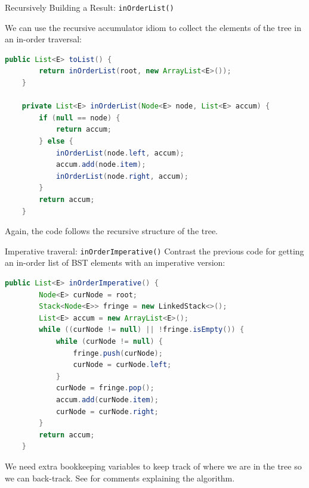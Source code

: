 \documentclass{beamer}
\begin{document}
\begin{frame}[fragile]{Recursively Building a Result: {\tt inOrderList()}}

We can use the recursive accumulator idiom to collect the elements of the tree in an in-order traversal:
\begin{lstlisting}[language=Java]
    public List<E> toList() {
        return inOrderList(root, new ArrayList<E>());
    }

    private List<E> inOrderList(Node<E> node, List<E> accum) {
        if (null == node) {
            return accum;
        } else {
            inOrderList(node.left, accum);
            accum.add(node.item);
            inOrderList(node.right, accum);
        }
        return accum;
    }
\end{lstlisting}

Again, the code follows the recursive structure of the tree.

\end{frame}

\begin{frame}[fragile]{Imperative traveral: {\tt inOrderImperative()}}
\vspace{-.05in}
Contrast the previous code for getting an in-order list of BST elements with an imperative version:
\vspace{-.05in}
\begin{lstlisting}[language=Java]
    public List<E> inOrderImperative() {
        Node<E> curNode = root;
        Stack<Node<E>> fringe = new LinkedStack<>();
        List<E> accum = new ArrayList<E>();
        while ((curNode != null) || !fringe.isEmpty()) {
            while (curNode != null) {
                fringe.push(curNode);
                curNode = curNode.left;
            }
            curNode = fringe.pop();
            accum.add(curNode.item);
            curNode = curNode.right;
        }
        return accum;
    }
\end{lstlisting}
\vspace{-.05in}
We need extra bookkeeping variables to keep track of where we are in the tree so we can back-track.  See  for comments explaining the algorithm.

\end{frame}
\end{document}
